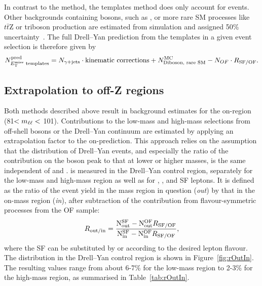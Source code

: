 In contrast to the \JZB method, the \MET templates method does only account for \zjets events. Other backgrounds containing \Z bosons, such as \WZ, \ZZ or more rare SM processes like $t\bar{t}\mathrm{Z}$ or triboson production are estimated from simulation and assigned 50\% uncertainty~\cite{Khachatryan:2015lwa}. The full Drell--Yan prediction from the \MET templates in a given event selection is therefore given by
\begin{equation*}
N_{E_{\mathrm{T}}^{\mathrm{miss}}\text{ templates}}^{\text{pred}} = N_{\gamma+\text{jets}}\cdot\text{kinematic corrections} + N_{\text{Diboson, rare SM}}^{\text{MC}} - N_{OF}\cdot R_{\text{SF/OF}}. 
\end{equation*}
\subsection{Extrapolation to off-Z regions}
\label{sec:ROutIn}
Both methods described above result in background estimates for the on-\Z region (81\GeV $< m_{\ell\ell} < $ 101\GeV). Contributions to the low-mass and high-mass selections from off-shell \Z bosons or the Drell--Yan continuum are estimated by applying an extrapolation factor \Routin to the on-\Z prediction. This approach relies on the assumption that the \mll distribution of Drell--Yan events, and especially the ratio of the contribution on the \Z boson peak to that at lower or higher masses, is the same independent of \MET and \njets. \Routin is measured in the Drell--Yan control region, separately for the low-mass and high-mass region as well as for \EE, \MM, and SF leptons. It is defined as the ratio of the event yield in the mass region in question (\textit{out}) by that in the on-\Z mass region (\textit{in}), after subtraction of the contribution from flavour-symmetric processes from the OF sample:
\begin{equation}
R_\text{out/in} = \frac{\mathrm{N}_{\mathrm{out}}^{\mathrm{SF}} - \mathrm{N}_{\mathrm{out}}^{\mathrm{OF}}R_{\text{SF/OF}}}{ \mathrm{N}_{\mathrm{in}}^{\mathrm{SF}} - \mathrm{N}_{\mathrm{in}}^{\mathrm{OF}}R_{\text{SF/OF}}},
\end{equation} 
where the SF can be substituted by \EE or \MM according to the desired lepton flavour. The \mll distribution in the Drell--Yan control region is shown in Figure~\ref{fig:rOutIn}. The resulting values range from about 6-7\% for the low-mass region to 2-3\% for the high-mass region, as summarised in Table~\ref{tab:rOutIn}.
